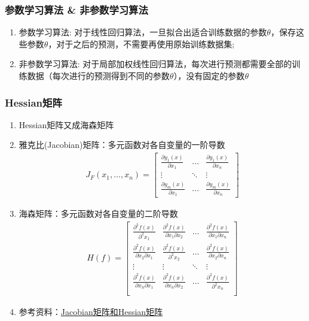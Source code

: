 \subsubsection{参数学习算法 \& 非参数学习算法}
\begin{enumerate}
	\item 参数学习算法: 对于线性回归算法，一旦拟合出适合训练数据的参数$\theta$，保存这些参数$\theta$，对于之后的预测，不需要再使用原始训练数据集; 
	\item 非参数学习算法: 对于局部加权线性回归算法，每次进行预测都需要全部的训练数据（每次进行的预测得到不同的参数$\theta$），没有固定的参数$\theta$
\end{enumerate}


\subsubsection{Hessian矩阵}
\begin{enumerate}
	\item Hessian矩阵又成海森矩阵
	\item 雅克比(Jacobian)矩阵：多元函数对各自变量的一阶导数
	\begin{align}
	J_F(x_1, \dots, x_n) = 
		\left[\begin{matrix}
			\frac{\partial y_1(x)}{\partial x_1} & \dots & \frac{\partial y_1(x)}{\partial x_n} \\
			\vdots & \ddots & \vdots \\
			\frac{\partial y_m(x)}{\partial x_1} & \dots & \frac{\partial y_m(x)}{\partial x_n}
		\end{matrix}\right]
	\end{align}
	\item 海森矩阵：多元函数对各自变量的二阶导数
	\begin{align}
		H(f) = 
		\left[\begin{matrix}
			\frac{\partial^2 f(x)}{\partial^2 x_1} & \frac{\partial^2 f(x)}{\partial x_1\partial x_2}& \dots & \frac{\partial^2 f(x)}{\partial x_1\partial x_n} \\
			\frac{\partial^2 f(x)}{\partial x_2\partial x_1} & \frac{\partial^2 f(x)}{\partial^2 x_2}& \dots & \frac{\partial^2 f(x)}{\partial x_2\partial x_n} \\
			\vdots & \vdots & \ddots & \vdots \\
			\frac{\partial^2 f(x)}{\partial x_n\partial x_1} & \frac{\partial^2 f(x)}{\partial x_n\partial x_2}& \dots & \frac{\partial^2 f(x)}{\partial^2 x_n} \\
		\end{matrix}\right]
	\end{align}




	\item 参考资料：\href{http://jacoxu.com/jacobian矩阵和hessian矩阵/}{Jacobian矩阵和Hessian矩阵}
\end{enumerate}
